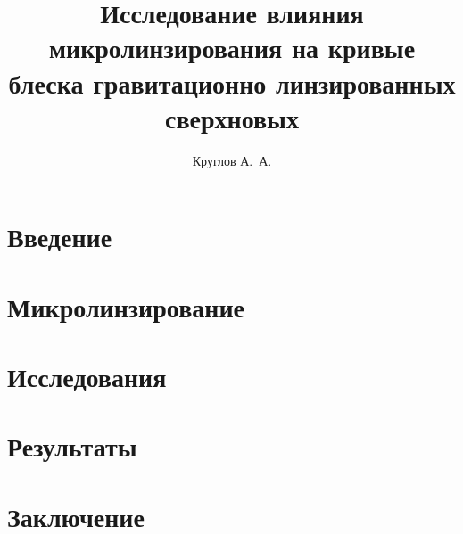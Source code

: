 \documentclass{mipt-thesis-bs}
\title{Исследование влияния микролинзирования на кривые
           блеска гравитационно линзированных сверхновых}
\author{Круглов А.\ А.}
\numberwithin{equation}{chapter}
\begin{document}
    \frontmatter
    
    \titlecontents
    
    \mainmatter


\chapter{Введение}
    

\chapter{Микролинзирование}
    
    
\chapter{Исследования}
    

\chapter{Результаты}

\chapter{Заключение}

    \backmatter

    \printbib
    
    
\end{document}
